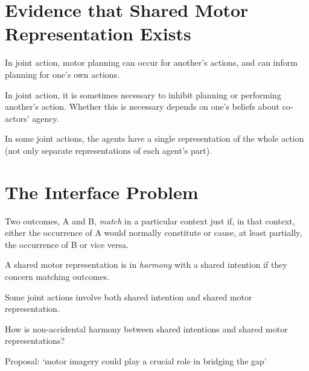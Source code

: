 \documentclass[12pt]{extarticle}
\begin{document}
\begin{multicols}{3}
%



\section{Evidence that Shared Motor %
Representation Exists}

In joint action, motor planning can occur for another's actions,\citep{kourtis:2012_predictive} and can inform planning for one's own actions.\citep{vesper:2012_jumping}  %

In joint action, it is sometimes necessary to inhibit planning or performing another's action.\citep{sebanz:2006_twin_peaks} 
Whether this is necessary depends on one's beliefs about co-actors' agency.\citep{tsai:2008_action}

In some joint actions, the agents have a single representation of the whole action (not only separate representations of each agent's part).\citep{tsai:2011_groop_effect}







\section{The Interface Problem}
Two  outcomes, A and B, \emph{match} in a particular context just if, in that context, either the occurrence of A would normally constitute or cause, at least partially, the occurrence of B or vice versa. 

A shared motor representation is in \emph{harmony} with a shared intention if they concern matching outcomes.

Some joint actions involve both shared intention and shared motor representation.

How is non-accidental harmony between shared intentions and shared motor representations?

Proposal: `motor imagery could play a crucial role in bridging the gap'\citep{pacherie:2000_content}


\footnotesize 


\end{multicols}
\end{document}
